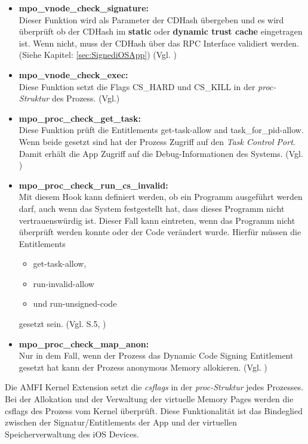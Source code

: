 \begin{itemize}
    \item \label{item:AMFIfunc} \textbf{mpo\_vnode\_check\_signature:} \\
    Dieser Funktion wird als Parameter der CDHash übergeben und es wird überprüft ob der CDHash im \textbf{static} oder \textbf{dynamic trust cache} eingetragen ist. Wenn nicht, muss der CDHash über das RPC Interface validiert werden. (Siehe Kapitel: \ref{sec:SignediOSApp}) (Vgl. \cite{iOSSec[5], Hacking[1]})
    \item \textbf{mpo\_vnode\_check\_exec:}\\
    Diese Funktion setzt die Flags CS\_HARD und CS\_KILL in der \textit{\glqq proc-Struktur\grqq{}} des Prozess. (Vgl.\cite{iOSSec[5],  Hacking[1]})
    \item \textbf{mpo\_proc\_check\_get\_task:}\\
    Diese Funktion prüft die Entitlements get-task-allow and task\_for\_pid-allow. Wenn beide gesetzt sind hat der Prozess Zugriff auf den \textit{\glqq Task Control Port\grqq{}}. Damit erhält  die App Zugriff auf die Debug-Informationen des Systems. (Vgl. \cite{iOSSec[5],  Hacking[1]})
    
    \item \textbf{mpo\_proc\_check\_run\_cs\_invalid:} \\
    Mit diesem Hook kann definiert werden, ob ein Programm ausgeführt werden darf, auch wenn das System festgestellt hat, dass dieses Programm nicht vertrauenswürdig ist. Dieser Fall kann eintreten, wenn das Programm nicht überprüft werden konnte oder der Code verändert wurde. Hierfür müssen die Entitlements 
    \begin{itemize}
        \item get-task-allow, 
        \item run-invalid-allow 
        \item und run-unsigned-code 
     \end{itemize} 
     gesetzt sein. (Vgl. \cite{iOSSec[5]} S.5, \cite{Hacking[1]})
    
    \item \textbf{mpo\_proc\_check\_map\_anon:}\\
    Nur in dem Fall, wenn der Prozess das Dynamic Code Signing Entitlement gesetzt hat kann der Prozess anonymous Memory allokieren. (Vgl. \cite{iOSSec[5],  Hacking[1]})
\end{itemize}

Die AMFI Kernel Extension setzt die \textit{\glqq csflags\grqq{}} in der \textit{\glqq proc-Struktur\grqq{}} jedes Prozesses. Bei der Allokation und der Verwaltung der virtuelle Memory Pages werden die csflags des Prozess  vom Kernel überprüft. Diese Funktionalität ist das Bindeglied zwischen der Signatur/Entitlements der App und der virtuellen Speicherverwaltung des iOS Devices. 

